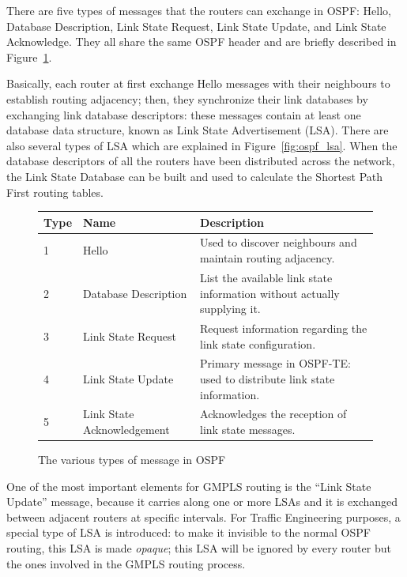 \documentclass[10pt,a4paper]{report}
\begin{document}
There are five types of messages that the routers can exchange in
OSPF: Hello, Database Description, Link State Request, Link State
Update, and Link State Acknowledge. They all share the same OSPF
header and are briefly described in Figure~\ref{fig:ospf_messages}.

Basically, each router at first exchange Hello messages with their
neighbours to establish routing adjacency; then, they synchronize
their link databases by exchanging link database descriptors: these
messages contain at least one database data structure, known as Link
State Advertisement (LSA). There are also several types of LSA which
are explained in Figure~\ref{fig:ospf_lsa}. When the database
descriptors of all the routers have been distributed across the
network, the Link State Database can be built and used to calculate
the Shortest Path First routing tables.

\begin{figure}[!tbp]
  \begin{center}
    \begin{tabular}{|l|l|p{}|}
      \hline
      Type & Name & Description \\ \hline
      1 & Hello & Used to discover neighbours and maintain routing
      adjacency. \\
      2 & Database Description & List the available link state
      information without actually supplying it. \\
      3 & Link State Request & Request information regarding the link
      state configuration. \\
      4 & Link State Update & Primary message in OSPF-TE: used to
      distribute link state information. \\
      5 & Link State Acknowledgement & Acknowledges the reception of
      link state messages. \\
      \hline
    \end{tabular}
    \caption[OSPF Messages]{The various types of message in OSPF}
    \label{fig:ospf_messages}
  \end{center}
\end{figure}

One of the most important elements for GMPLS routing is the ``Link
State Update'' message, because it carries along one or more LSAs and
it is exchanged between adjacent routers at specific intervals. For
Traffic Engineering purposes, a special type of LSA is introduced: to
make it invisible to the normal OSPF routing, this LSA is made
\textit{opaque}; this LSA will be ignored by every router but the ones
involved in the GMPLS routing process.
\end{document}
